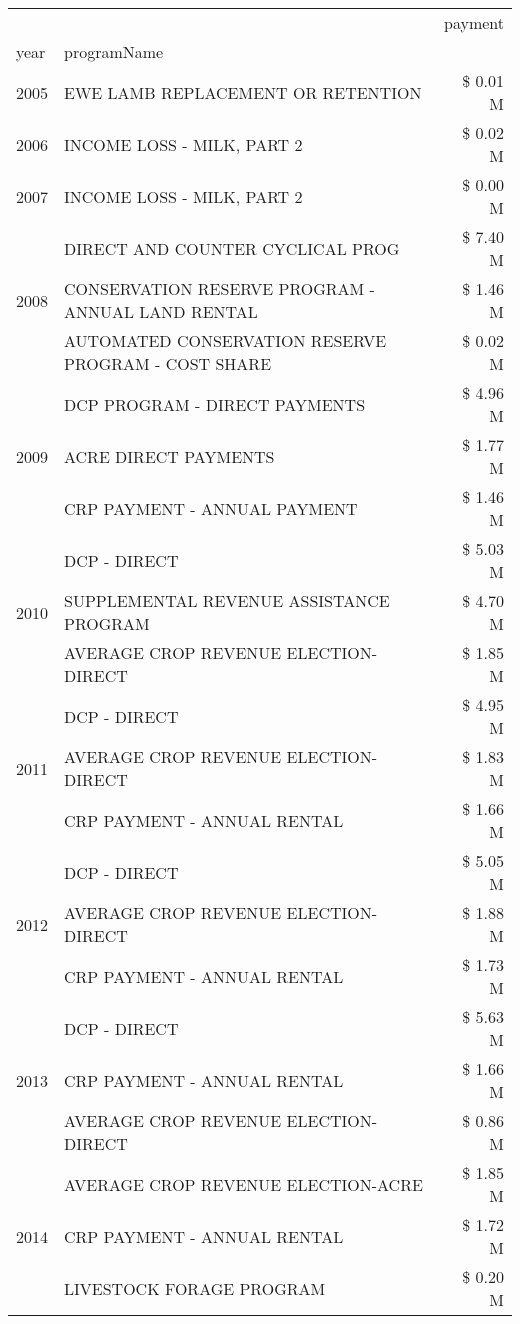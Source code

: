 \begin{tabular}{llr}
\toprule
 &  & payment \\
year & programName &  \\
\midrule
2005 & EWE LAMB REPLACEMENT OR RETENTION & \$ 0.01 M \\
\cline{1-3}
2006 & INCOME LOSS - MILK, PART 2 & \$ 0.02 M \\
\cline{1-3}
2007 & INCOME LOSS - MILK, PART 2 & \$ 0.00 M \\
\cline{1-3}
\multirow[t]{3}{*}{2008} & DIRECT AND COUNTER CYCLICAL PROG & \$ 7.40 M \\
 & CONSERVATION RESERVE PROGRAM - ANNUAL LAND RENTAL & \$ 1.46 M \\
 & AUTOMATED CONSERVATION RESERVE PROGRAM - COST SHARE & \$ 0.02 M \\
\cline{1-3}
\multirow[t]{3}{*}{2009} & DCP PROGRAM - DIRECT PAYMENTS & \$ 4.96 M \\
 & ACRE DIRECT PAYMENTS & \$ 1.77 M \\
 & CRP PAYMENT - ANNUAL PAYMENT & \$ 1.46 M \\
\cline{1-3}
\multirow[t]{3}{*}{2010} & DCP - DIRECT & \$ 5.03 M \\
 & SUPPLEMENTAL REVENUE ASSISTANCE PROGRAM & \$ 4.70 M \\
 & AVERAGE CROP REVENUE ELECTION-DIRECT & \$ 1.85 M \\
\cline{1-3}
\multirow[t]{3}{*}{2011} & DCP - DIRECT & \$ 4.95 M \\
 & AVERAGE CROP REVENUE ELECTION-DIRECT & \$ 1.83 M \\
 & CRP PAYMENT - ANNUAL RENTAL & \$ 1.66 M \\
\cline{1-3}
\multirow[t]{3}{*}{2012} & DCP - DIRECT & \$ 5.05 M \\
 & AVERAGE CROP REVENUE ELECTION-DIRECT & \$ 1.88 M \\
 & CRP PAYMENT - ANNUAL RENTAL & \$ 1.73 M \\
\cline{1-3}
\multirow[t]{3}{*}{2013} & DCP - DIRECT & \$ 5.63 M \\
 & CRP PAYMENT - ANNUAL RENTAL & \$ 1.66 M \\
 & AVERAGE CROP REVENUE ELECTION-DIRECT & \$ 0.86 M \\
\cline{1-3}
\multirow[t]{3}{*}{2014} & AVERAGE CROP REVENUE ELECTION-ACRE & \$ 1.85 M \\
 & CRP PAYMENT - ANNUAL RENTAL & \$ 1.72 M \\
 & LIVESTOCK FORAGE PROGRAM & \$ 0.20 M \\
\cline{1-3}

\end{tabular}
